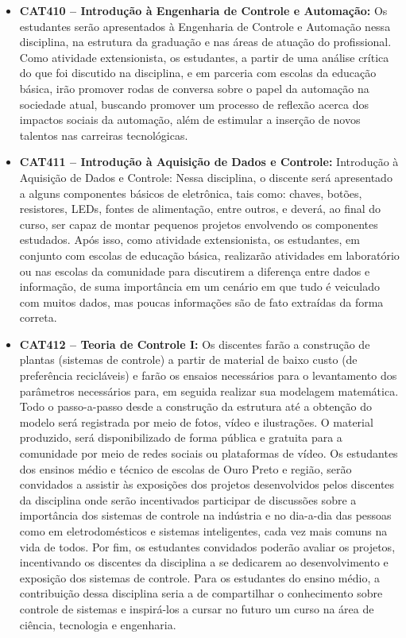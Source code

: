 \documentclass[
	12pt,				%
	openright,			%
	oneside,			%
	a4paper,			%
	english,			%
	brazil				%
	]{abntex2}
\begin{document}
\begin{itemize}
    \item \textbf{CAT410 -- Introdução à Engenharia de Controle e Automação:} Os estudantes serão apresentados à Engenharia de Controle e Automação nessa disciplina, na estrutura da graduação e nas áreas de atuação do profissional. Como atividade extensionista, os estudantes, a partir de uma análise crítica do que foi discutido na disciplina, e em parceria com escolas da educação básica, irão promover rodas de conversa sobre o papel da automação na sociedade atual, buscando promover um processo de reflexão acerca dos impactos sociais da automação, além de estimular a inserção de novos talentos nas carreiras tecnológicas.

    \item \textbf{CAT411 -- Introdução à Aquisição de Dados e Controle:} Introdução à Aquisição de Dados e Controle: Nessa disciplina, o discente será apresentado a alguns componentes básicos de eletrônica, tais como: chaves, botões, resistores, LEDs, fontes de alimentação, entre outros, e deverá, ao final do curso, ser capaz de montar pequenos projetos envolvendo os componentes estudados. Após isso, como atividade extensionista, os estudantes, em conjunto com escolas de educação básica, realizarão atividades em laboratório ou nas escolas da comunidade para discutirem a diferença entre dados e informação, de suma importância em um cenário em que tudo é veiculado com muitos dados, mas poucas informações são de fato extraídas da forma correta.

    \item \textbf{CAT412 -- Teoria de Controle I:} Os discentes farão a construção de plantas (sistemas de controle) a partir de material de baixo custo (de preferência recicláveis) e farão os ensaios necessários para o levantamento dos parâmetros necessários para, em seguida realizar sua modelagem matemática. Todo o passo-a-passo desde a construção da estrutura até a obtenção do modelo será registrada por meio de fotos, vídeo e ilustrações. O material produzido, será disponibilizado de forma pública e gratuita para a comunidade por meio de redes sociais ou plataformas de vídeo. Os estudantes dos ensinos médio e técnico de escolas de Ouro Preto e região, serão convidados a assistir às exposições dos projetos desenvolvidos pelos discentes da disciplina onde serão incentivados participar de discussões sobre a importância dos sistemas de controle na indústria e no dia-a-dia das pessoas como em eletrodomésticos e sistemas inteligentes, cada vez mais comuns na vida de todos. Por fim, os estudantes convidados poderão avaliar os projetos, incentivando os discentes da disciplina a se dedicarem ao desenvolvimento e exposição dos sistemas de controle. Para os estudantes do ensino médio, a contribuição dessa disciplina seria a de compartilhar o conhecimento sobre controle de sistemas e inspirá-los a cursar no futuro um curso na área de ciência, tecnologia e engenharia.


\end{itemize}
\end{document}

